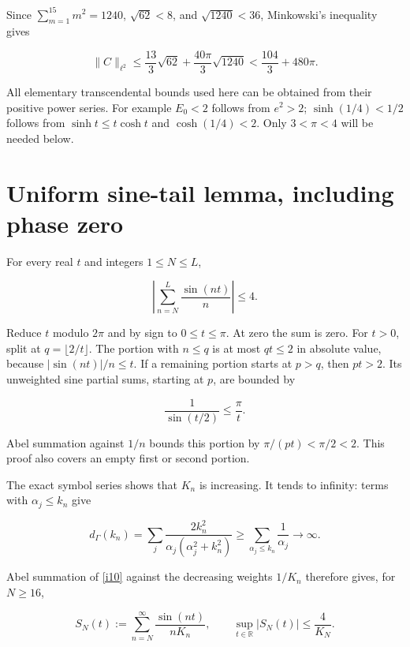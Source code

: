 \documentclass[11pt]{article}
\begin{document}
Since \(\sum_{m=1}^{15}m^2=1240\), \(\sqrt{62}<8\), and \(\sqrt{1240}<36\), Minkowski's inequality gives

\begin{equation}\label{i9}
\|C\|_{\ell^2}
 \le\frac{13}3\sqrt{62}+\frac{40\pi}3\sqrt{1240}
 <\frac{104}3+480\pi.
\end{equation}

All elementary transcendental bounds used here can be obtained from their positive power series. For example \(E_0<2\) follows from \(e^2>2\); \(\sinh(1/4)<1/2\) follows from \(\sinh t\le t\cosh t\) and \(\cosh(1/4)<2\). Only \(3<\pi<4\) will be needed below.

\section{Uniform sine-tail lemma, including phase zero}

For every real \(t\) and integers \(1\le N\le L\),

\begin{equation}\label{i10}
\left|\sum_{n=N}^L\frac{\sin(nt)}n\right|\le4.
\end{equation}

Reduce \(t\) modulo \(2\pi\) and by sign to \(0\le t\le\pi\). At zero the sum is zero. For \(t>0\), split at \(q=\lfloor2/t\rfloor\). The portion with \(n\le q\) is at most \(qt\le2\) in absolute value, because \(|\sin(nt)|/n\le t\). If a remaining portion starts at \(p>q\), then \(pt>2\). Its unweighted sine partial sums, starting at \(p\), are bounded by

\[
 \frac1{\sin(t/2)}\le\frac\pi t.
\]

Abel summation against \(1/n\) bounds this portion by \(\pi/(pt)<\pi/2<2\). This proof also covers an empty first or second portion.

The exact symbol series shows that \(K_n\) is increasing. It tends to infinity: terms with \(\alpha_j\le k_n\) give

\[
 d_\Gamma(k_n)
 =\sum_j\frac{2k_n^2}{\alpha_j(\alpha_j^2+k_n^2)}
 \ge\sum_{\alpha_j\le k_n}\frac1{\alpha_j}\longrightarrow\infty.
\]

Abel summation of \eqref{i10} against the decreasing weights \(1/K_n\) therefore gives, for \(N\ge16\),

\begin{equation}\label{i11}
S_N(t):=\sum_{n=N}^{\infty}\frac{\sin(nt)}{nK_n},
 \qquad \sup_{t\in\mathbb R}|S_N(t)|\le\frac4{K_N}.
\end{equation}
\end{document}
